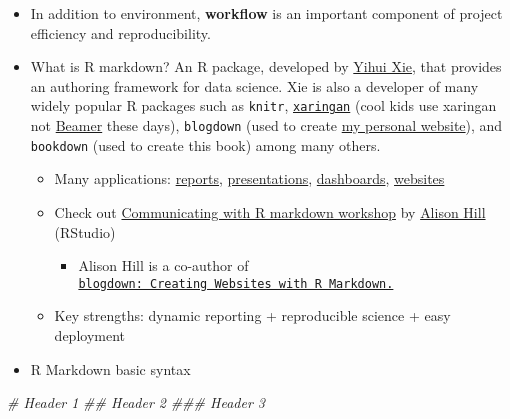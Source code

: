 \documentclass[
]{book}
\newenvironment{Shaded}{\begin{snugshade}}{\end{snugshade}}
\newcommand{\CommentTok}[1]{\textcolor[rgb]{0.56,0.35,0.01}{\textit{#1}}}
\providecommand{\tightlist}{%
  \setlength{\itemsep}{0pt}\setlength{\parskip}{0pt}}
\begin{document}
\begin{itemize}
\item
  In addition to environment, \textbf{workflow} is an important component of project efficiency and reproducibility.
\item
  What is R markdown? An R package, developed by \href{https://yihui.org/en/}{Yihui Xie}, that provides an authoring framework for data science. Xie is also a developer of many widely popular R packages such as \texttt{knitr}, \href{https://github.com/yihui/xaringan}{\texttt{xaringan}} (cool kids use xaringan not \href{https://en.wikipedia.org/wiki/Beamer_(LaTeX)}{Beamer} these days), \texttt{blogdown} (used to create \href{https://jaeyk.github.io/}{my personal website}), and \texttt{bookdown} (used to create this book) among many others.

  \begin{itemize}
  \tightlist
  \item
    Many applications: \href{https://rstudio.github.io/distill/basics.html}{reports}, \href{https://bookdown.org/yihui/rmarkdown/xaringan.html}{presentations}, \href{https://rmarkdown.rstudio.com/flexdashboard/}{dashboards}, \href{https://bookdown.org/yihui/rmarkdown/websites.html}{websites}\\
  \item
    Check out \href{https://ysc-rmarkdown.netlify.app/}{Communicating with R markdown workshop} by \href{https://alison.rbind.io/}{Alison Hill} (RStudio)

    \begin{itemize}
    \tightlist
    \item
      Alison Hill is a co-author of \href{https://bookdown.org/yihui/blogdown/}{\texttt{blogdown:\ Creating\ Websites\ with\ R\ Markdown.}}
    \end{itemize}
  \item
    Key strengths: dynamic reporting + reproducible science + easy deployment
  \end{itemize}
\end{itemize}

\begin{itemize}
\tightlist
\item
  R Markdown basic syntax
\end{itemize}

\begin{Shaded}
\begin{Highlighting}[]
\CommentTok{\# Header 1}
\CommentTok{\#\# Header 2}
\CommentTok{\#\#\# Header 3}
\end{Highlighting}
\end{Shaded}
\end{document}
